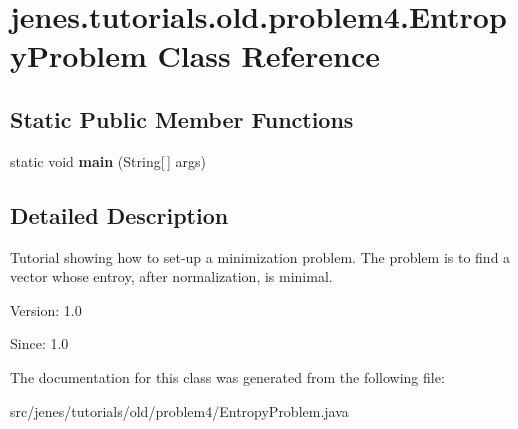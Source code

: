 \hypertarget{classjenes_1_1tutorials_1_1old_1_1problem4_1_1_entropy_problem}{
\section{jenes.tutorials.old.problem4.EntropyProblem Class Reference}
\label{classjenes_1_1tutorials_1_1old_1_1problem4_1_1_entropy_problem}
}
\subsection*{Static Public Member Functions}
\begin{CompactItemize}
\item 
\hypertarget{classjenes_1_1tutorials_1_1old_1_1problem4_1_1_entropy_problem_0d51bbf6082f703157baaa168dd5f217}{
static void \textbf{main} (String\mbox{[}$\,$\mbox{]} args)}
\label{classjenes_1_1tutorials_1_1old_1_1problem4_1_1_entropy_problem_0d51bbf6082f703157baaa168dd5f217}

\end{CompactItemize}


\subsection{Detailed Description}
Tutorial showing how to set-up a minimization problem. The problem is to find a vector whose entroy, after normalization, is minimal.

\begin{Desc}
\item[Version:]1.0 \end{Desc}
\begin{Desc}
\item[Since:]1.0 \end{Desc}


The documentation for this class was generated from the following file:\begin{CompactItemize}
\item 
src/jenes/tutorials/old/problem4/EntropyProblem.java\end{CompactItemize}
